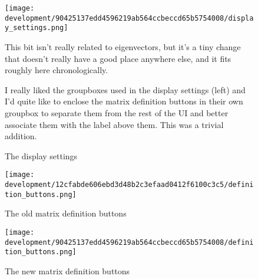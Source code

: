 \documentclass[../development.tex]{subfiles}
\begin{document}
\begin{figure}[H]
	\begin{minipage}{0.35\linewidth}
		\centering
		\texttt{[image: development/90425137edd4596219ab564ccbeccd65b5754008/display\_settings.png]}
		\caption{The display settings}
		\label{fig:development:90425137edd4596219ab564ccbeccd65b5754008:display_settings.png}
	\end{minipage}\hfill
	\begin{minipage}{0.6\linewidth}\setspacing
		This bit isn't really related to eigenvectors, but it's a tiny change that doesn't really have a good place anywhere else, and it fits roughly here chronologically.

		I really liked the groupboxes used in the display settings (left) and I'd quite like to enclose the matrix definition buttons in their own groupbox to separate them from the rest of the UI and better associate them with the label above them. This was a trivial addition.
	\end{minipage}
	\vspace{-1em}
\end{figure}


\begin{figure}[H]
	\hspace{0.08\linewidth}
	\begin{minipage}{0.35\linewidth}
		\centering
		\texttt{[image: development/12cfabde606ebd3d48b2c3efaad0412f6100c3c5/definition\_buttons.png]}
		\caption{The old matrix definition buttons}
		\label{fig:development:12cfabde606ebd3d48b2c3efaad0412f6100c3c5:definition_buttons.png}
	\end{minipage}\hfill
	\begin{minipage}{0.35\linewidth}
		\centering
		\texttt{[image: development/90425137edd4596219ab564ccbeccd65b5754008/definition\_buttons.png]}
		\caption{The new matrix definition buttons}
		\label{fig:development:90425137edd4596219ab564ccbeccd65b5754008:definition_buttons.png}
	\end{minipage}
	\hspace{0.08\linewidth}
\end{figure}
\end{document}
